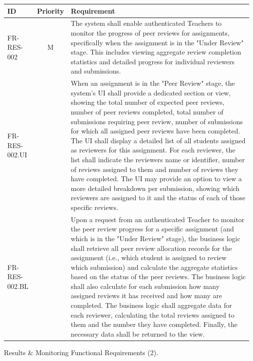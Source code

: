 \begin{longtable}{|l|c|p{10cm}|}
    \hline
    \textbf{ID} & \textbf{Priority} & \textbf{Requirement} \\
    \endhead %
    \hline
    FR-RES-002 & M & The system shall enable authenticated Teachers to monitor the progress of peer reviews for assignments, specifically when the assignment is in the "Under Review" stage. This includes viewing aggregate review completion statistics and detailed progress for individual reviewers and submissions. \\
    \quad FR-RES-002.UI &  & \quad When an assignment is in the "Peer Review" stage, the system's UI shall provide a dedicated section or view, showing the total number of expected peer reviews, number of peer reviews completed, total number of submissions requiring peer review, number of submissions for which all assigned peer reviews have been completed. The UI shall display a detailed list of all students assigned as reviewers for this assignment. For each reviewer, the list shall indicate the reviewers name or identifier, number of reviews assigned to them and number of reviews they have completed. The UI may provide an option to view a more detailed breakdown per submission, showing which reviewers are assigned to it and the status of each of those specific reviews. \\
    \quad FR-RES-002.BL &  & \quad Upon a request from an authenticated Teacher to monitor the peer review progress for a specific assignment (and which is in the "Under Review" stage), the business logic shall retrieve all peer review allocation records for the assignment (i.e., which student is assigned to review which submission) and calculate the aggregate statistics based on the status of the peer reviews. The business logic shall also calculate for each submission how many assigned reviews it has received and how many are completed. The business logic shall aggregate data for each reviewer, calculating the total reviews assigned to them and the number they have completed. Finally, the necessary data shall be returned to the view. \\
    \hline
\end{longtable}
\begin{table}[h]
    \centering
    \caption{Results \& Monitoring Functional Requirements (2).}
    \label{tab:ResultMonitoringFR2}
\end{table}
\clearpage

